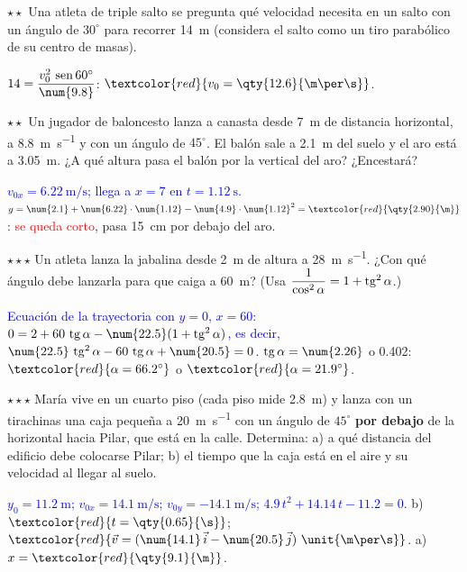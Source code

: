 \begin{exercise}
    \(\star\star\) Una atleta de triple salto se pregunta qué velocidad necesita en un salto con un ángulo de \(30^\circ\) para
    recorrer \qty{14}{\m} (considera el salto como un tiro parabólico de su centro de masas).
    \begin{solu}
        \(14 = \dfrac{v_0^2\,\sen 60^\circ}{\num{9.8}}\): \(\textcolor{red}{v_0 = \qty{12.6}{\m\per\s}}\).
    \end{solu}
\end{exercise}

\begin{exercise}
    \(\star\star\) Un jugador de baloncesto lanza a canasta desde \qty{7}{\m} de distancia horizontal, a \qty{8.8}{\m\per\s} y con un
    ángulo de \(45^\circ\). El balón sale a \qty{2.1}{\m} del suelo y el aro está a \qty{3.05}{\m}. ¿A qué altura pasa el balón por la
    vertical del aro? ¿Encestará?
    \begin{solu}
        \textcolor{blue}{\(v_{0x} = \qty{6.22}{\m\per\s}\); llega a \(x = 7\) en \(t = \qty{1.12}{\s}\).} \(y = \num{2.1} + \num{6.22} \cdot
        \num{1.12} - \num{4.9} \cdot \num{1.12}^2 = \textcolor{red}{\qty{2.90}{\m}}\): \textcolor{red}{se queda corto}, pasa
        \qty{15}{\cm} por debajo del aro.
    \end{solu}
\end{exercise}

\begin{exercise}
    \(\star\star\star\) Un atleta lanza la jabalina desde \qty{2}{\m} de altura a \qty{28}{\m\per\s}. ¿Con qué ángulo debe lanzarla
    para que caiga a \qty{60}{\m}? (Usa \(\dfrac{1}{\cos^2\alpha} = 1 + \operatorname{tg}^2\alpha\).)
    \begin{solu}
        \textcolor{blue}{Ecuación de la trayectoria con \(y = 0\), \(x = 60\): \(0 = 2 + 60\,\tg\alpha - \num{22.5}(1 + \tg^2\alpha)\),
        es decir, \(\num{22.5}\,\tg^2\alpha - 60\,\tg\alpha + \num{20.5} = 0\).} \(\tg\alpha = \num{2.26}\) o \num{0.402}:
        \(\textcolor{red}{\alpha = 66.2^\circ}\) o \(\textcolor{red}{\alpha = 21.9^\circ}\).
    \end{solu}
\end{exercise}

\begin{exercise}
    \(\star\star\star\) María vive en un cuarto piso (cada piso mide \qty{2.8}{\m}) y lanza con un tirachinas una caja pequeña a
    \qty{20}{\m\per\s} con un ángulo de \(45^\circ\) \textbf{por debajo} de la horizontal hacia Pilar, que está en la calle.
    Determina: a) a qué distancia del edificio debe colocarse Pilar; b) el tiempo que la caja está en el aire y su velocidad al
    llegar al suelo.
    \begin{solu}
        \textcolor{blue}{\(y_0 = \qty{11.2}{\m}\); \(v_{0x} = \qty{14.1}{\m\per\s}\); \(v_{0y} = \qty{-14.1}{\m\per\s}\);
        \(\num{4.9}\,t^2 + \num{14.14}\,t - \num{11.2} = 0\).} b) \(\textcolor{red}{t = \qty{0.65}{\s}}\);
        \(\textcolor{red}{\vec v = (\num{14.1}\,\ivec - \num{20.5}\,\jvec)~\unit{\m\per\s}}\). a) \(x = \textcolor{red}{\qty{9.1}{\m}}\).
    \end{solu}
\end{exercise}

